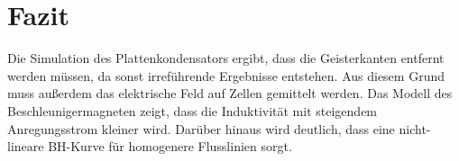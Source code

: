 \chapter{Fazit}\label{sec:fazit}
Die Simulation des Plattenkondensators ergibt, dass die Geisterkanten entfernt werden müssen, da sonst irreführende Ergebnisse entstehen. Aus diesem Grund muss außerdem das elektrische Feld auf Zellen gemittelt werden. Das Modell des Beschleunigermagneten zeigt, dass die Induktivität mit steigendem Anregungsstrom kleiner wird. Darüber hinaus wird deutlich, dass eine nicht-lineare BH-Kurve für homogenere Flusslinien sorgt.